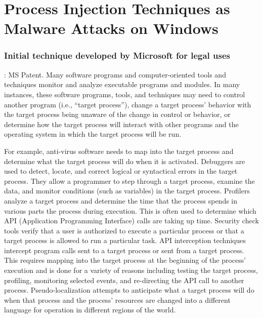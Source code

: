\documentclass{article}
\begin{document}


\section{Process Injection Techniques as Malware Attacks on Windows}

\subsubsection{\textcite{Ghizzoni:2004} Initial technique developed by Microsoft for legal uses}
\textbf{}: MS Patent. Many software programs and computer-oriented tools and techniques monitor and analyze executable programs and modules. In many instances, these software programs, tools, and techniques may need to control another program (i.e., “target process”), change a target process' behavior with the target process being unaware of the change in control or behavior, or determine how the target process will interact with other programs and the operating system in which the target process will be run.

For example, anti-virus software needs to map into the target process and determine what the target process will do when it is activated. Debuggers are used to detect, locate, and correct logical or syntactical errors in the target process. They allow a programmer to step through a target process, examine the data, and monitor conditions (such as variables) in the target process. Profilers analyze a target process and determine the time that the process spends in various parts the process during execution. This is often used to determine which API (Application Programming Interface) calls are taking up time. Security check tools verify that a user is authorized to execute a particular process or that a target process is allowed to run a particular task. API interception techniques intercept program calls sent to a target process or sent from a target process. This requires mapping into the target process at the beginning of the process' execution and is done for a variety of reasons including testing the target process, profiling, monitoring selected events, and re-directing the API call to another process. Pseudo-localization attempts to anticipate what a target process will do when that process and the process' resources are changed into a different language for operation in different regions of the world.
\end{document}

